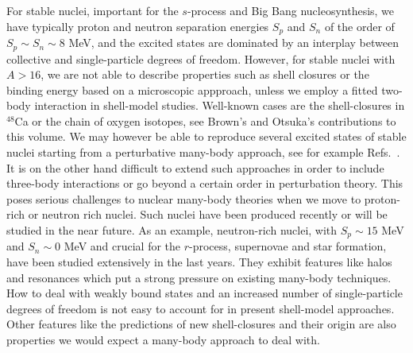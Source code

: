 \documentclass[12pt]{iopart}
\begin{document}
For stable nuclei, important for the $s$-process and Big Bang nucleosynthesis,
we have typically proton and
neutron separation energies $S_p$ and $S_n$ of the  order of $S_p\sim S_n \sim 8$ MeV,
and the excited states are dominated by an interplay between collective and 
single-particle  degrees of freedom. 
However, for stable nuclei with $A > 16$, we are not able to describe
properties such as shell closures or the binding energy based on a microscopic appproach,
unless we employ a fitted two-body interaction in shell-model studies. 
Well-known cases are the shell-closures in $^{48}$Ca or the chain of oxygen isotopes,
see Brown's and Otsuka's contributions to this volume.
We may however be able
to reproduce several excited states of stable nuclei starting from a perturbative 
many-body approach, see for example Refs.~\cite{mhj95,dean2004}. 
It is on the other hand difficult to extend such approaches in 
order to include three-body interactions or go 
beyond a certain order in perturbation theory. 
This poses serious challenges to nuclear many-body theories when we move to proton-rich
or neutron rich nuclei. Such nuclei have been produced recently 
or will be studied in the near future. As an example, neutron-rich nuclei, with 
$S_p\sim 15$ MeV and $S_n\sim 0$ MeV and crucial for the $r$-process, supernovae and 
star formation, have been studied extensively in the last years. They exhibit features 
like halos and resonances which put a strong pressure on existing   
many-body techniques. How to deal with weakly bound states and an increased number of 
single-particle degrees of freedom is not easy to account for in present shell-model 
approaches. Other features like the predictions of new shell-closures and their origin
are also properties we would expect a many-body approach to deal with. 
\end{document}

